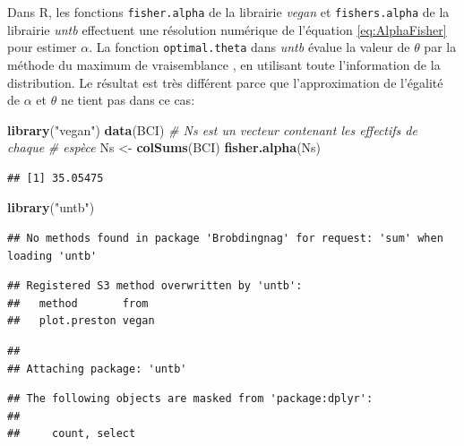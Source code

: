 \documentclass[
  11pt,
  french,
  a4paper,
  extrafontsizes,onecolumn,openright
  ]{memoir}
\newenvironment{Shaded}{\begin{snugshade}}{\end{snugshade}}
\newcommand{\CommentTok}[1]{\textcolor[rgb]{0.56,0.35,0.01}{\textit{#1}}}
\newcommand{\FunctionTok}[1]{\textcolor[rgb]{0.13,0.29,0.53}{\textbf{#1}}}
\newcommand{\NormalTok}[1]{#1}
\newcommand{\OtherTok}[1]{\textcolor[rgb]{0.56,0.35,0.01}{#1}}
\newcommand{\StringTok}[1]{\textcolor[rgb]{0.31,0.60,0.02}{#1}}
\begin{document}
Dans R, les fonctions \texttt{fisher.alpha} de la librairie \emph{vegan} et \texttt{fishers.alpha} de la librairie \emph{untb} \autocite{Hankin2007} effectuent une résolution numérique de l'équation \eqref{eq:AlphaFisher} pour estimer \(\alpha\).
La fonction \texttt{optimal.theta} dans \emph{untb} évalue la valeur de \(\theta\) par la méthode du maximum de vraisemblance \autocite[page 122]{Hubbell2001}, en utilisant toute l'information de la distribution.
Le résultat est très différent parce que l'approximation de l'égalité de \(\alpha\) et \(\theta\) ne tient pas dans ce cas:

\scriptsize

\begin{Shaded}
\begin{Highlighting}[]
\FunctionTok{library}\NormalTok{(}\StringTok{"vegan"}\NormalTok{)}
\FunctionTok{data}\NormalTok{(BCI)}
\CommentTok{\# Ns est un vecteur contenant les effectifs de chaque}
\CommentTok{\# espèce}
\NormalTok{Ns }\OtherTok{\textless{}{-}} \FunctionTok{colSums}\NormalTok{(BCI)}
\FunctionTok{fisher.alpha}\NormalTok{(Ns)}
\end{Highlighting}
\end{Shaded}

\begin{verbatim}
## [1] 35.05475
\end{verbatim}

\begin{Shaded}
\begin{Highlighting}[]
\FunctionTok{library}\NormalTok{(}\StringTok{"untb"}\NormalTok{)}
\end{Highlighting}
\end{Shaded}

\begin{verbatim}
## No methods found in package 'Brobdingnag' for request: 'sum' when loading 'untb'
\end{verbatim}

\begin{verbatim}
## Registered S3 method overwritten by 'untb':
##   method       from 
##   plot.preston vegan
\end{verbatim}

\begin{verbatim}
## 
## Attaching package: 'untb'
\end{verbatim}

\begin{verbatim}
## The following objects are masked from 'package:dplyr':
## 
##     count, select
\end{verbatim}
\end{document}
